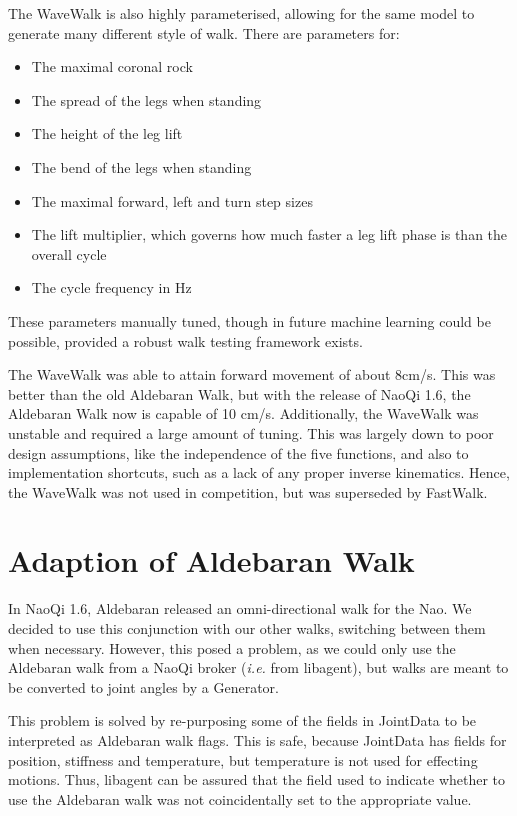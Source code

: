\documentclass[pdftex,11pt,a4paper]{report}
\begin{document}
The WaveWalk is also highly parameterised, allowing for the same model to
generate many different style of walk. There are parameters for:
\begin{itemize}
    \item The maximal coronal rock
    \item The spread of the legs when standing
    \item The height of the leg lift
    \item The bend of the legs when standing
    \item The maximal forward, left and turn step sizes
    \item The lift multiplier, which governs how much faster a leg lift
        phase is than the overall cycle
    \item The cycle frequency in Hz
\end{itemize}
These parameters manually tuned, though in future machine learning could be
possible, provided a robust walk testing framework exists.

The WaveWalk was able to attain forward movement of about 8cm/s. This was
better than the old Aldebaran Walk, but with the release of NaoQi 1.6, the
Aldebaran Walk now is capable of 10 cm/s. Additionally, the WaveWalk was
unstable and required a large amount of tuning. This was largely down to
poor design assumptions, like the independence of the five functions, and
also to implementation shortcuts, such as a lack of any proper inverse
kinematics. Hence, the WaveWalk was not used in competition, but was
superseded by FastWalk.

\section{Adaption of Aldebaran Walk}
In NaoQi 1.6, Aldebaran released an omni-directional walk for the Nao. We
decided to use this conjunction with our other walks, switching between
them when necessary. However, this posed a problem, as we could only use
the Aldebaran walk from a NaoQi broker (\textit{i.e.} from libagent), but
walks are meant to be converted to joint angles by a Generator.

This problem is solved by re-purposing some of the fields in JointData to
be interpreted as Aldebaran walk flags. This is safe, because JointData has
fields for position, stiffness and temperature, but temperature is not used
for effecting motions. Thus, libagent can be assured that the field used to
indicate whether to use the Aldebaran walk was not coincidentally set to
the appropriate value.
\end{document}

